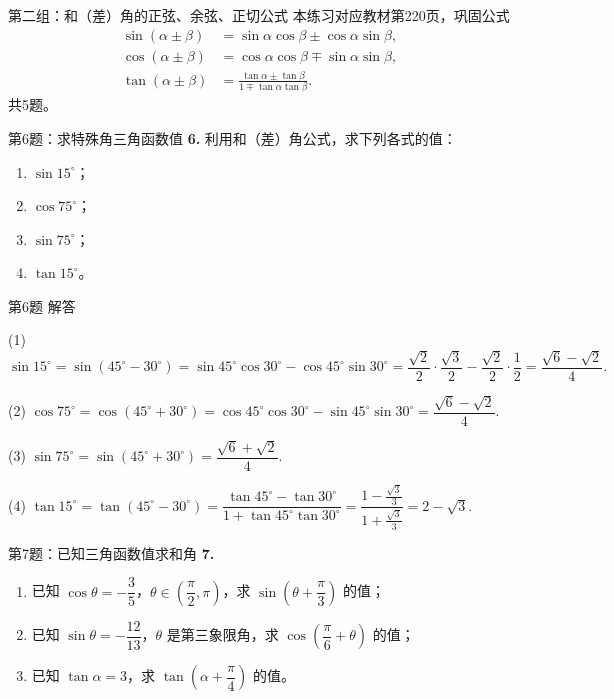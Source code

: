 \documentclass[10pt,aspectratio=169,serif]{beamer}
\begin{document}
\begin{frame}{第二组：和（差）角的正弦、余弦、正切公式}
本练习对应教材第220页，巩固公式
\[
\begin{aligned}
\sin(\alpha\pm\beta)&=\sin\alpha\cos\beta\pm\cos\alpha\sin\beta,\\
\cos(\alpha\pm\beta)&=\cos\alpha\cos\beta\mp\sin\alpha\sin\beta,\\
\tan(\alpha\pm\beta)&=\frac{\tan\alpha\pm\tan\beta}{1\mp\tan\alpha\tan\beta}.
\end{aligned}
\]
共5题。
\end{frame}

\begin{frame}[t]{第6题：求特殊角三角函数值}
\textbf{6.} 利用和（差）角公式，求下列各式的值：
\begin{enumerate}
  \item $\sin 15^\circ$；\qquad
  \item $\cos 75^\circ$；\qquad
  \item $\sin 75^\circ$；\qquad
  \item $\tan 15^\circ$。
\end{enumerate}
\end{frame}

\begin{frame}[t]{第6题 解答}
\begin{tcolorbox}[colback=orange!10,colframe=orange,title=\textbf{解}]
(1) $\sin15^\circ=\sin(45^\circ-30^\circ)=\sin45^\circ\cos30^\circ-\cos45^\circ\sin30^\circ
=\dfrac{\sqrt2}{2}\!\cdot\!\dfrac{\sqrt3}{2}-\dfrac{\sqrt2}{2}\!\cdot\!\dfrac12=\dfrac{\sqrt6-\sqrt2}{4}.$

(2) $\cos75^\circ=\cos(45^\circ+30^\circ)=\cos45^\circ\cos30^\circ-\sin45^\circ\sin30^\circ
=\dfrac{\sqrt6-\sqrt2}{4}.$

(3) $\sin75^\circ=\sin(45^\circ+30^\circ)=\dfrac{\sqrt6+\sqrt2}{4}.$

(4) $\tan15^\circ=\tan(45^\circ-30^\circ)=\dfrac{\tan45^\circ-\tan30^\circ}{1+\tan45^\circ\tan30^\circ}
=\dfrac{1-\frac{\sqrt3}{3}}{1+\frac{\sqrt3}{3}}=2-\sqrt3.$
\end{tcolorbox}
\end{frame}

\begin{frame}[t]{第7题：已知三角函数值求和角}
\textbf{7.}
\begin{enumerate}
  \item 已知 $\cos\theta=-\dfrac35$，$\theta\in\left(\dfrac{\pi}{2},\pi\right)$，求 $\sin\left(\theta+\dfrac{\pi}{3}\right)$ 的值；
  \item 已知 $\sin\theta=-\dfrac{12}{13}$，$\theta$ 是第三象限角，求 $\cos\left(\dfrac{\pi}{6}+\theta\right)$ 的值；
  \item 已知 $\tan\alpha=3$，求 $\tan\left(\alpha+\dfrac{\pi}{4}\right)$ 的值。
\end{enumerate}
\end{frame}
\end{document}
